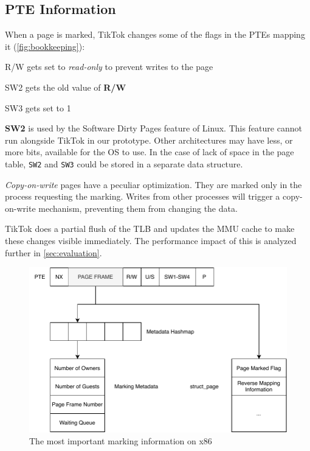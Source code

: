 \documentclass[conference]{IEEEtran}
\newcommand{\sysname}{TikTok}
\begin{document}
\subsection{PTE Information}
\label{subsec:pageinfo}

When a page is marked, \sysname{} changes some of the flags in the PTEs mapping it
(\autoref{fig:bookkeeping}):

\begin{LaTeXdescription}
  \item[R/W] gets set to \emph{read-only} to prevent writes to the page
  \item[SW2] gets the old value of \textbf{R/W}
  \item[SW3] gets set to 1 
\end{LaTeXdescription}

\textbf{SW2} is used by the Software Dirty Pages
feature of Linux. This feature cannot run alongside \sysname{} in our prototype.
Other architectures may have less, or more bits, available for the OS to use. In
the case of lack of space in the page table, \texttt{SW2} and \texttt{SW3} could
be stored in a separate data structure.

\emph{Copy-on-write} pages have a peculiar optimization. They are marked only in
the process requesting the marking. Writes from other processes will trigger a
copy-on-write mechanism, preventing them from changing the data.

\sysname{} does a partial flush of the TLB and updates the MMU cache to make these
changes visible immediately. The performance impact of this is analyzed further
in \autoref{sec:evaluation}.

\begin{figure}[]
  \centering
  \includegraphics[width=\linewidth]{img/book-keeping.pdf}
  \caption{The most important marking information on x86}
  \label{fig:bookkeeping}
\end{figure}
\end{document}
